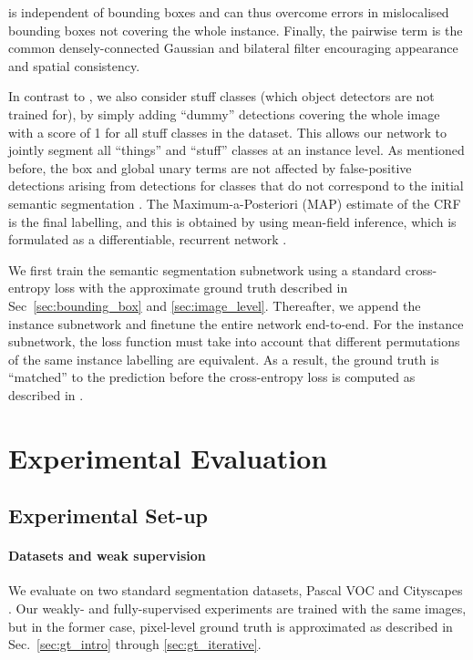 \documentclass[runningheads]{llncs}
\begin{document}
is independent of bounding boxes and can thus overcome errors in mislocalised bounding boxes not covering the whole instance.
Finally, the pairwise term is the common densely-connected Gaussian and bilateral filter \cite{krahenbuhl_2011} encouraging appearance and spatial consistency.

In contrast to \cite{arnab_cvpr_2017}, we also consider stuff classes (which object detectors are not trained for), by simply adding ``dummy'' detections covering the whole image with a score of 1 for all stuff classes in the dataset.
This allows our network to jointly segment all ``things'' and ``stuff'' classes at an instance level.
As mentioned before, the box and global unary terms are not affected by false-positive detections arising from detections for classes that do not correspond to the initial semantic segmentation .
The Maximum-a-Posteriori (MAP) estimate of the CRF is the final labelling, and this is obtained by using mean-field inference, which is formulated as a differentiable, recurrent network \cite{zheng_2015,arnab_ieeespm_2018}.

We first train the semantic segmentation subnetwork using a standard cross-entropy loss with the approximate ground truth described in Sec~\ref{sec:bounding_box} and \ref{sec:image_level}.
Thereafter, we append the instance subnetwork and finetune the entire network end-to-end.
For the instance subnetwork, the loss function must take into account that different permutations of the same instance labelling are equivalent.
As a result, the ground truth is ``matched'' to the prediction before the cross-entropy loss is computed as described in \cite{arnab_cvpr_2017}. \section{Experimental Evaluation}

\subsection{Experimental Set-up}
\paragraph{Datasets and weak supervision}
We evaluate on two standard segmentation datasets, Pascal VOC \cite{everingham_2010} and Cityscapes \cite{cordts_cvpr_2016}.
Our weakly- and fully-supervised experiments are trained with the same images, but in the former case, pixel-level ground truth is approximated as described in Sec.~\ref{sec:gt_intro} through \ref{sec:gt_iterative}.
\end{document}
